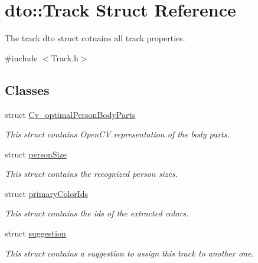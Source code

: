 \hypertarget{structdto_1_1_track}{}\section{dto\+:\+:Track Struct Reference}
\label{structdto_1_1_track}


The track dto struct cotnains all track properties.  




{\ttfamily \#include $<$Track.\+h$>$}

\subsection*{Classes}
\begin{DoxyCompactItemize}
\item 
struct \mbox{\hyperlink{structdto_1_1_track_1_1_cv__optimal_person_body_parts}{Cv\+\_\+optimal\+Person\+Body\+Parts}}
\begin{DoxyCompactList}\small\item\em This struct contains Open\+CV representation of the body parts. \end{DoxyCompactList}\item 
struct \mbox{\hyperlink{structdto_1_1_track_1_1person_size}{person\+Size}}
\begin{DoxyCompactList}\small\item\em This struct contains the recognized person sizes. \end{DoxyCompactList}\item 
struct \mbox{\hyperlink{structdto_1_1_track_1_1primary_color_ids}{primary\+Color\+Ids}}
\begin{DoxyCompactList}\small\item\em This struct contains the ids of the extracted colors. \end{DoxyCompactList}\item 
struct \mbox{\hyperlink{structdto_1_1_track_1_1suggestion}{suggestion}}
\begin{DoxyCompactList}\small\item\em This struct contains a suggestion to assign this track to another one. \end{DoxyCompactList}\end{DoxyCompactItemize}
